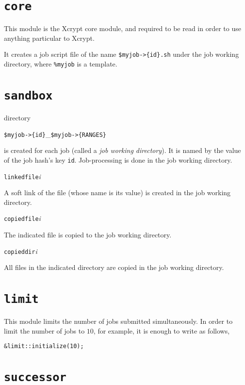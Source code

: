 \documentclass[a4paper,10pt]{report}
\begin{document}
\section{\texttt{core}}

This module is the Xcrypt core module, and required to be read in
order to use anything particular to Xcrypt.

It creates a job script file of the name \texttt{\$myjob->\{id\}.sh}
under the job working directory, where \texttt{\%myjob} is a template.

\section{\texttt{sandbox}}

directory

\begin{center}
 \texttt{\$myjob->\{id\}}\_\texttt{\$myjob->\{RANGES\}}
\end{center}

is created for each job (called a \textit{job working directory}).  It is
named by the value of the job hash's key \texttt{id}.  Job-processing
is done in the job working directory.

\texttt{linkedfile}\textit{i}

A soft link of the file (whose name is its value) is created in the
job working directory.

\texttt{copiedfile}\textit{i}

The indicated file is copied to the job working directory.

\texttt{copieddir}\textit{i}

All files in the indicated directory are copied
in the job working directory.
\fi


\section{\texttt{limit}}

This module limits the number of jobs submitted simultaneously.
In order to limit the number of jobs to $10$, for example, it is enough to
write as follows,
\begin{boxnote}
\begin{verbatim}
&limit::initialize(10);
\end{verbatim}
\end{boxnote}

\section{\texttt{successor}}
\end{document}
